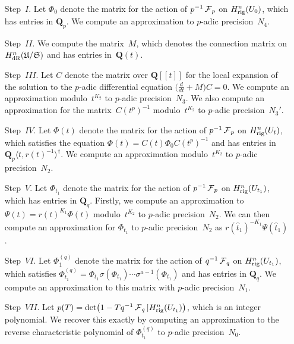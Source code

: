 \begin{enumerate}
\item[Step~$I$.]
Let $\Phi_0$ denote the matrix for the action of $p^{-1} \operatorname{\mathcal{F}}_p$ on 
$H_{\text{rig}}^{n}(U_0)$, which has entries in $\mathbf{Q}_p$.  
We compute an approximation to $p$-adic precision~$N_4$.
\item[Step~$II$.]
We compute the matrix~$M$, which denotes the connection matrix 
on $H_{\text{dR}}^{n}(\mathfrak{U}/\mathfrak{S})$ and has entries in~$\mathbf{Q}(t)$.
\item[Step~$III$.]
Let $C$ denote the matrix over $\mathbf{Q}[[t]]$ for the local 
expansion of the solution to the $p$-adic differential equation 
$\bigl(\tfrac{d}{dt} + M\bigr) C = 0$.  We compute an approximation 
modulo~$t^{K_2}$ to $p$-adic precision~$N_3$.  We also compute an 
approximation for the matrix~$C(t^p)^{-1}$ modulo~$t^{K_2}$ to $p$-adic 
precision~$N_3'$.
\item[Step~$IV$.]
Let $\Phi(t)$ denote the matrix for the action of $p^{-1} \operatorname{\mathcal{F}}_p$ on 
$H_{\text{rig}}^{n}(U_t)$, which satisfies the equation 
$\Phi(t) = C(t) \Phi_0 C(t^p)^{-1}$ and has entries in 
$\mathbf{Q}_p\langle t,r(t)^{-1}\rangle^{\dagger}$.  We compute an 
approximation modulo~$t^{K_2}$ to $p$-adic precision~$N_2$.
\item[Step~$V$.]
Let $\Phi_{t_1}$ denote the matrix for the action of $p^{-1} \operatorname{\mathcal{F}}_p$ 
on $H_{\text{rig}}^{n}(U_{t_1})$, which has entries in $\mathbf{Q}_q$. 
Firstly, we compute an approximation to $\Psi(t) = r(t)^{K_1} \Phi(t)$ 
modulo~$t^{K_2}$ to $p$-adic precision~$N_2$.  We can then compute an 
approximation for $\Phi_{t_1}$ to $p$-adic precision~$N_2$ as 
$r(\hat{t}_1)^{-K_1} \Psi(\hat{t}_1)$.
\item[Step~$VI$.]
Let $\Phi_1^{(q)}$ denote the matrix for the action of $q^{-1} \operatorname{\mathcal{F}}_q$ on 
$H_{\text{rig}}^{n}(U_{t_1})$, which satisfies 
$\Phi_{t_1}^{(q)} = \Phi_{t_1} \sigma(\Phi_{t_1}) \dotsm \sigma^{a-1}(\Phi_{t_1})$ 
and has entries in $\mathbf{Q}_q$.  We compute an approximation to this 
matrix with $p$-adic precision~$N_1$.
\item[Step~$VII$.]
Let $p(T) = \det\bigl(1 - T q^{-1} \operatorname{\mathcal{F}}_q | H_{\text{rig}}^n(U_{t_1})\bigr)$, 
which is an integer polynomial.  We recover this exactly 
by computing an approximation to the reverse characteristic polynomial 
of $\Phi_{t_1}^{(q)}$ to $p$-adic precision~$N_0$.
\end{enumerate}

